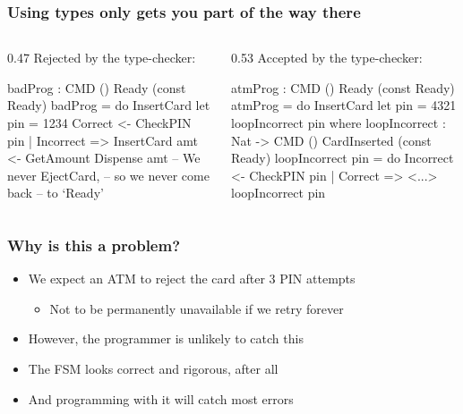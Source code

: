 \documentclass[compress,handout]{beamer}
\begin{document}
\begin{frame}[fragile]  %
  \frametitle{Using types only gets you part of the way there}

  \begin{columns}
  \begin{column}{0.47\framewidth}
    {\color{red} Rejected by the type-checker:}
    \vspace*{-3mm}
    \begin{idrislisting}[basicstyle=\ttfamily\scriptsize]
badProg : CMD ()
            Ready (const Ready)
badProg = do
  InsertCard
  let pin = 1234
  Correct <- CheckPIN pin
    | Incorrect => InsertCard
  amt <- GetAmount
  Dispense amt 
  -- We never EjectCard,
  -- so we never come back
  -- to `Ready'
    \end{idrislisting}
  \end{column}

  \pause  %

  \hspace*{-0.6mm}
  \vrule{}

  \begin{column}{0.53\framewidth}
    {\color{orange} Accepted by the type-checker:}
    \vspace*{-3mm}
    \begin{idrislisting}[basicstyle=\ttfamily\scriptsize]
atmProg : CMD ()
            Ready (const Ready)
atmProg = do
    InsertCard
    let pin = 4321
    loopIncorrect pin
  where
    loopIncorrect : Nat -> CMD ()
                      CardInserted
                      (const Ready)
    loopIncorrect pin = do
      Incorrect <- CheckPIN pin
        | Correct => <...>
      loopIncorrect pin
    \end{idrislisting}
    \vspace*{-6mm}
  \end{column}
  \end{columns}
\end{frame}


\begin{frame}
  \frametitle{Why is this a problem?}

  \begin{itemize}
    \item<1-> We expect an ATM to reject the card after 3 PIN attempts
    \begin{itemize}
      \item<2-> Not to be permanently unavailable if we retry forever
    \end{itemize}
    \item<3-> However, the programmer is unlikely to catch this
    \item<4-> The FSM looks correct and rigorous, after all
    \item<5-> And programming with it will catch most errors
  \end{itemize}
\end{frame}
\end{document}

